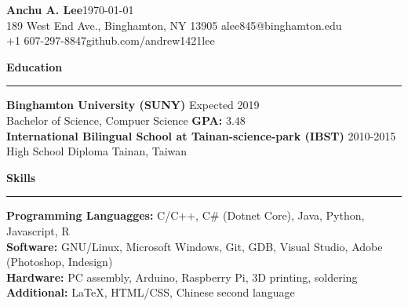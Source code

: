 \documentclass[11pt]{article}
\newcommand{\Hrule}{\vspace{1mm}\hrule\vspace{1mm}}
\begin{document}
    \noindent\Large\textbf{Anchu A. Lee}\hfill \small\monthyear\today\\
    \noindent\small{189 West End Ave., Binghamton, NY 13905} \hfill \small{alee845@binghamton.edu}\\
    \noindent\small{+1 607-297-8847}\hfill \small{github.com/andrew1421lee}\vspace{1mm}

    \noindent\large\textbf{Education}
    \Hrule
        \indent \small\textbf{Binghamton University (SUNY)} \hfill \small{Expected 2019}\indent\\
            \indent\indent\small{Bachelor of Science, Compuer Science \textbar \textbf{ GPA:} 3.48}\vspace{1mm}\\
        \indent \small\textbf{International Bilingual School at Tainan-science-park (IBST)} \hfill \small{2010-2015}\indent\\
            \indent\indent \small{High School Diploma } \hfill \small{Tainan, Taiwan}\indent\vspace{1mm}

    \noindent\large\textbf{Skills}
    \Hrule
        \indent \small\textbf{Programming Languagges: }\small{C/C++, C\# (Dotnet Core), Java, Python, Javascript, R}\vspace{0.5mm} \\
        \indent \small\textbf{Software: }\small{GNU/Linux, Microsoft Windows, Git, GDB, Visual Studio, Adobe (Photoshop, Indesign)}\vspace{0.5mm}\\
        \indent \small\textbf{Hardware: }\small{PC assembly, Arduino, Raspberry Pi, 3D printing, soldering}\vspace{0.5mm}\\
        \indent \small\textbf{Additional: }\small{LaTeX, HTML/CSS, Chinese second language}\vspace{1mm}
\end{document}
